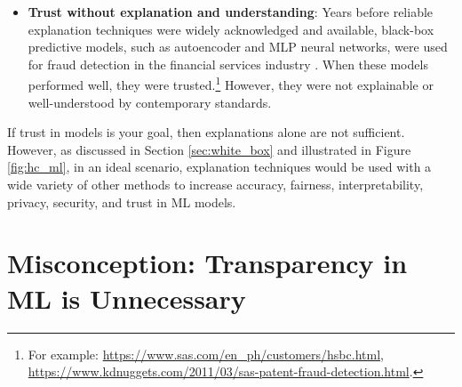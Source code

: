 \documentclass[fleqn]{article}
\begin{document}
\begin{itemize}
\begin{figure}[htb!]
\begin{subfigure}{.5\textwidth}
  		\caption{$g_{\text{GBM}}$ deviance residuals and predictions by \texttt{PAY\_0}.}
  		\label{fig:resid}
	\end{subfigure}
	\caption{An unconstrained GBM probability of default model, $g_{\text{GBM}}$, over-emphasizes the importance of the input feature \texttt{PAY\_0}, a customer's most recent repayment status. $g_{\text{GBM}}$ produces large positive residuals when \texttt{PAY\_0} indicates on-time payments (\texttt{PAY\_0} $\leq$ 1) and large negative residuals when \texttt{PAY\_0} indicates late payments (\texttt{PAY\_0} $>$ 1). $g_{\text{GBM}}$ is explainable, but probably not trustworthy.}
	\label{fig:global_shap_resid}
\end{figure}

\item \textbf{Trust without explanation and understanding}: Years before reliable explanation techniques were widely acknowledged and available, black-box predictive models, such as autoencoder and MLP neural networks, were used for fraud detection in the financial services industry \cite{gopinathan1998fraud}. When these models performed well, they were trusted.\footnote{For example: \url{https://www.sas.com/en_ph/customers/hsbc.html}, \url{https://www.kdnuggets.com/2011/03/sas-patent-fraud-detection.html}.} However, they were not explainable or well-understood by contemporary standards.  

\end{itemize}

If trust in models is your goal, then explanations alone are not sufficient. However, as discussed in Section \ref{sec:white_box} and illustrated in Figure \ref{fig:hc_ml}, in an ideal scenario, explanation techniques would be used with a wide variety of other methods to increase accuracy, fairness, interpretability, privacy, security, and trust in ML models. 

\section{Misconception: Transparency in ML is Unnecessary}
\end{document}
